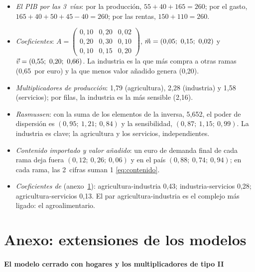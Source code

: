 \documentclass[11pt]{article}
\begin{document}
\begin{itemize}
\item \emph{El PIB por las 3~vías}: por la producción, $55+40+165=260$; por el gasto, $165+40+50+45-40=260$; por las rentas, $150+110=260$.
\item \emph{Coeficientes}: $A=\begin{pmatrix}0{,}10 & 0{,}20 & 0{,}02\\ 0{,}20 & 0{,}30 & 0{,}10\\ 0{,}10 & 0{,}15 & 0{,}20\end{pmatrix}$, $\vec{m}=(0{,}05;\ 0{,}15;\ 0{,}02)$ y $\vec{v}=(0{,}55;\ 0{,}20;\ 0{,}66)$. La industria es la que más compra a otras ramas (0,65~por euro) y la que menos valor añadido genera (0,20).
\item \emph{Multiplicadores de producción}: 1,79 (agricultura), 2,28 (industria) y 1,58 (servicios); por filas, la industria es la más sensible (2,16).
\item \emph{Rasmussen}: con la suma de los elementos de la inversa, 5,652, el poder de dispersión es $(0{,}95;\ 1{,}21;\ 0{,}84)$ y la sensibilidad, $(0{,}87;\ 1{,}15;\ 0{,}99)$. La industria es clave; la agricultura y los servicios, independientes.
\item \emph{Contenido importado y valor añadido}: un euro de demanda final de cada rama deja fuera $(0{,}12;\ 0{,}26;\ 0{,}06)$ y en el país $(0{,}88;\ 0{,}74;\ 0{,}94)$; en cada rama, las 2~cifras suman 1 \eqref{eq:contenido}.
\item \emph{Coeficientes de } (anexo~\ref{anexo:extensiones}): agricultura-industria 0,43; industria-servicios 0,28; agricultura-servicios 0,13. El par agricultura-industria es el complejo más ligado: el agroalimentario.
\end{itemize}

\section{Anexo: extensiones de los modelos}\label{anexo:extensiones}

\paragraph{El modelo cerrado con hogares y los multiplicadores de tipo II}
\end{document}
